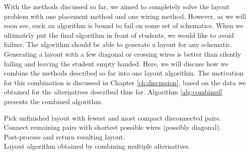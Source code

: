 With the methods discussed so far, we aimed to completely solve the layout problem
with one placement method and one wiring method. However, as we will soon see,
such an algorithm is bound to fail on some set of schematics. When we ultimately
put the final algorithm in front of students, we would like to avoid failure.
The algorithm should be able to generate a layout for any schematic.
Generating a layout
with a few diagonal or crossing wires is better than silently failing and leaving
the student empty handed. Here, we will discuss how we combine the methods
described so far into one layout algorithm. The motivation for this combination
is discussed in Chapter \ref{ch:discussion}, based on the data we obtained
for the alternatives described thus far.
Algorithm \ref{alg:combined} presents the
combined algorithm.

\begin{algorithm}
\BlankLine
{}
Pick unfinished layout with fewest and most compact disconnected pairs.\\
Connect remaining pairs with shortest possible wires (possibly diagonal).\\
Post-process and return resulting layout.\\
\caption{Layout algorithm obtained by combining multiple alternatives.}
\label{alg:combined}
\end{algorithm}

